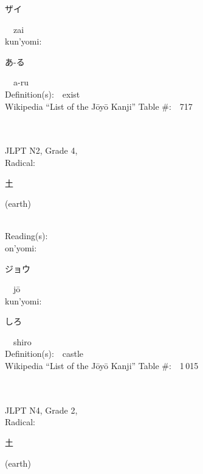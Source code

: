 \begin{multicols}{2}
{\hspace*{2em}}{\begin{CJK}{UTF8}{min} ザイ \end{CJK}}\ \ zai\ \ \\
{\hspace*{1em}}kun'yomi:\ \ \\
{\hspace*{2em}}{\begin{CJK}{UTF8}{min} あ-る \end{CJK}}\ \ a-ru\ \ \\
Definition(s):\ \ exist \\
Wikipedia ``List of the J\=oy\=o Kanji'' Table \#:\ \ 717 \\
\ \ \\
{\fontsize{34pt}{40pt}  }\ \ \\  %
{JLPT N2, Grade 4, \\Radical:\ \ {\begin{CJK}{UTF8}{min} 土 \end{CJK}} (earth) } \\
Reading(s):\ \ \\
{\hspace*{1em}}on'yomi:\ \ \\
{\hspace*{2em}}{\begin{CJK}{UTF8}{min} ジョウ \end{CJK}}\ \ j\=o\ \ \\
{\hspace*{1em}}kun'yomi:\ \ \\
{\hspace*{2em}}{\begin{CJK}{UTF8}{min} しろ \end{CJK}}\ \ shiro\ \ \\
Definition(s):\ \ castle \\
Wikipedia ``List of the J\=oy\=o Kanji'' Table \#:\ \ 1\,015 \\
\ \ \\
{\fontsize{34pt}{40pt}  }\ \ \\  %
{JLPT N4, Grade 2, \\Radical:\ \ {\begin{CJK}{UTF8}{min} 土 \end{CJK}} (earth) } \\

\end{multicols}
